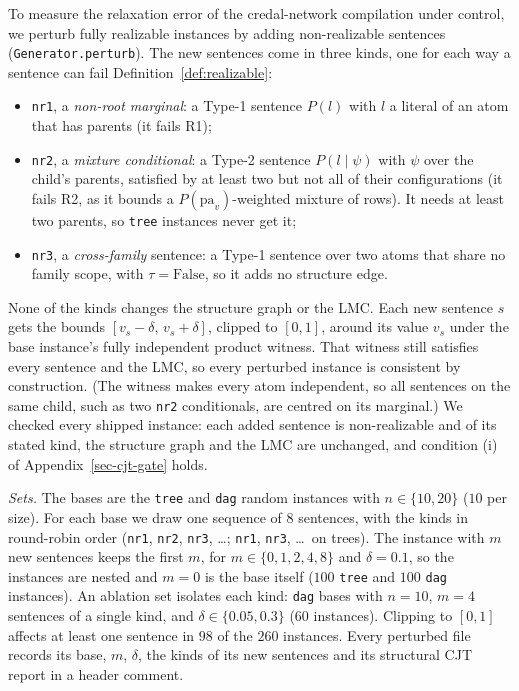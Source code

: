 \documentclass{article} %
\newcommand{\pa}{\mathrm{pa}}
\begin{document}
To measure the relaxation error of the credal-network compilation under control, we perturb fully realizable instances by adding non-realizable sentences (\texttt{Generator.perturb}). The new sentences come in three kinds, one for each way a sentence can fail Definition~\ref{def:realizable}:
\begin{itemize}
  \item \texttt{nr1}, a \emph{non-root marginal}: a Type-1 sentence $P(l)$ with $l$ a literal of an atom that has parents (it fails R1);
  \item \texttt{nr2}, a \emph{mixture conditional}: a Type-2 sentence $P(l\mid\psi)$ with $\psi$ over the child's parents, satisfied by at least two but not all of their configurations (it fails R2, as it bounds a $P(\pa_v)$-weighted mixture of rows). It needs at least two parents, so \texttt{tree} instances never get it;
  \item \texttt{nr3}, a \emph{cross-family} sentence: a Type-1 sentence over two atoms that share no family scope, with $\tau=\mathrm{False}$, so it adds no structure edge.
\end{itemize}
None of the kinds changes the structure graph or the LMC. Each new sentence $s$ gets the bounds $[v_s-\delta,\,v_s+\delta]$, clipped to $[0,1]$, around its value $v_s$ under the base instance's fully independent product witness. That witness still satisfies every sentence and the LMC, so every perturbed instance is consistent by construction. (The witness makes every atom independent, so all sentences on the same child, such as two \texttt{nr2} conditionals, are centred on its marginal.) We checked every shipped instance: each added sentence is non-realizable and of its stated kind, the structure graph and the LMC are unchanged, and condition (i) of Appendix~\ref{sec-cjt-gate} holds.

\emph{Sets.} The bases are the \texttt{tree} and \texttt{dag} random instances with $n\in\{10,20\}$ ($10$ per size). For each base we draw one sequence of $8$ sentences, with the kinds in round-robin order (\texttt{nr1}, \texttt{nr2}, \texttt{nr3}, \dots; \texttt{nr1}, \texttt{nr3}, \dots\ on trees). The instance with $m$ new sentences keeps the first $m$, for $m\in\{0,1,2,4,8\}$ and $\delta=0.1$, so the instances are nested and $m=0$ is the base itself ($100$ \texttt{tree} and $100$ \texttt{dag} instances). An ablation set isolates each kind: \texttt{dag} bases with $n=10$, $m=4$ sentences of a single kind, and $\delta\in\{0.05,0.3\}$ ($60$ instances). Clipping to $[0,1]$ affects at least one sentence in $98$ of the $260$ instances. Every perturbed file records its base, $m$, $\delta$, the kinds of its new sentences and its structural CJT report in a header comment.
\end{document}
